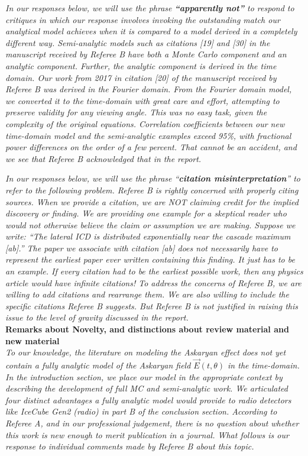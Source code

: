 \documentclass[12pt]{article}
\begin{document}
\textit{In our responses below, we will use the phrase \textbf{``apparently not''} to respond to critiques in which our response involves invoking the outstanding match our analytical model achieves when it is compared to a model derived in a completely different way.  Semi-analytic models such as citations [19] and [30] in the manuscript received by Referee B have both a Monte Carlo component and an analytic component.  Further, the analytic component is derived in the time domain.  Our work from 2017 in citation [20] of the manuscript received by Referee B was derived in the Fourier domain.  From the Fourier domain model, we converted it to the time-domain with great care and effort, attempting to preserve validity for any viewing angle.  This was no easy task, given the complexity of the original equations.  Correlation coefficients between our new time-domain model and the semi-analytic examples exceed 95\%, with fractional power differences on the order of a few percent.  That cannot be an accident, and we see that Referee B acknowledged that in the report.}

\textit{In our responses below, we will use the phrase ``\textbf{citation misinterpretation}'' to refer to the following problem.  Referee B is rightly concerned with properly citing sources.  When we provide a citation, we are NOT claiming credit for the implied discovery or finding.  We are providing one example for a skeptical reader who would not otherwise believe the claim or assumption we are making.  Suppose we write: ``The lateral ICD is distributed exponentially near the cascade maximum [ab].''  The paper we associate with citation [ab] does not necessarily have to represent the earliest paper ever written containing this finding.  It just has to be an example.  If every citation had to be the earliest possible work, then any physics article would have infinite citations!  To address the concerns of Referee B, we are willing to add citations and rearrange them.  We are also willing to include the specific citations Referee B suggests.  But Referee B is not justified in raising this issue to the level of gravity discussed in the report.} \\ 

\textbf{Remarks about Novelty, and distinctions about review material and new material} \\

\textit{To our knowledge, the literature on modeling the Askaryan effect does not yet contain a fully analytic model of the Askaryan field $\vec{E}(t,\theta)$ in the time-domain.  In the introduction section, we place our model in the appropriate context by describing the development of full MC and semi-analytic work.  We articulated four distinct advantages a fully analytic model would provide to radio detectors like IceCube Gen2 (radio) in part B of the conclusion section.  According to Referee A, and in our professional judgement, there is no question about whether this work is new enough to merit publication in a journal.  What follows is our response to individual comments made by Referee B about this topic.}
\end{document}
